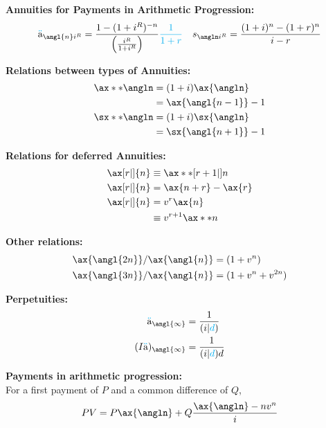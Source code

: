 \documentclass[10pt, french]{article}
\newcommand\cumlaut[2][black]{\stackon[.33ex]{#2}{\textcolor{#1}{\kern-.04ex.\kern-.2ex.}}}
\def\SectionColor{cobalt}
\begin{document}
\begin{multicols*}{2}
\textbf{Annuities for Payments in Arithmetic Progression:}
\begin{align*}
	\cumlaut[cyan]{a}_{\angl{n}i^{R}}
		&=	\frac{1 - (1 + i^{R})^{-n}}{\left( \frac{i^{R}}{1 + i^{R}} \right)} {\color{cyan}\frac{1}{1 + r}	}	&
	{s}_{\angln i^{R}}
		&=	\frac{(1+i)^{n} - (1 + r)^{n}}{i - r} 	\\
\end{align*}

\textbf{Relations between types of Annuities:}
\begin{align*}
	\ax**{\angln}	
	&=	(1 + i) \ax{\angln}	\\
	&=	\ax{\angl{n - 1}} - 1	\\
	\sx**{\angln}	
	&=	(1 + i) \sx{\angln}	\\
	&=	\sx{\angl{n + 1}} - 1	
\end{align*}

\textbf{Relations for deferred Annuities:}
\begin{align*}
	\ax[r|]{n} 
	&\equiv \ax**[r + 1| ]{n}	\\
	\ax[r|]{n}
	&=	\ax{n + r} - \ax{r}	\\
	\ax[r|]{n}
	&=	v^{r} \ax{n}		\\
	&\equiv	v^{r + 1} \ax**{n}	\\
\end{align*}

\textbf{Other relations:}
\begin{align*}
	\ax{\angl{2n}} / \ax{\angl{n}}
	&=	(1 + v^{n})	\\
	\ax{\angl{3n}} / \ax{\angl{n}}
	&=	(1 + v^{n} + v^{2n})	\\
\end{align*}

\textbf{Perpetuities:}
\begin{align*}
	\cumlaut[cyan]{a}_{\angl{\infty}} 
		&= \frac{1}{(i|\textcolor{cyan}{d})} 	\\
	(I\cumlaut[cyan]{a})_{\angl{\infty}} 
		&= \frac{1}{(i|\textcolor{cyan}{d})d} 	\\
\end{align*}


\textbf{Payments in arithmetic progression:}\\
For a first payment of $P$ and a common difference of $Q$, 
\begin{align*}
	PV
	&=	P\ax{\angln} + Q \frac{\ax{\angln} - n v^{n}}{i}	\\
\end{align*}

\newpage
\def\SectionColor{cyan!80!white}

\end{multicols*}
\end{document}
